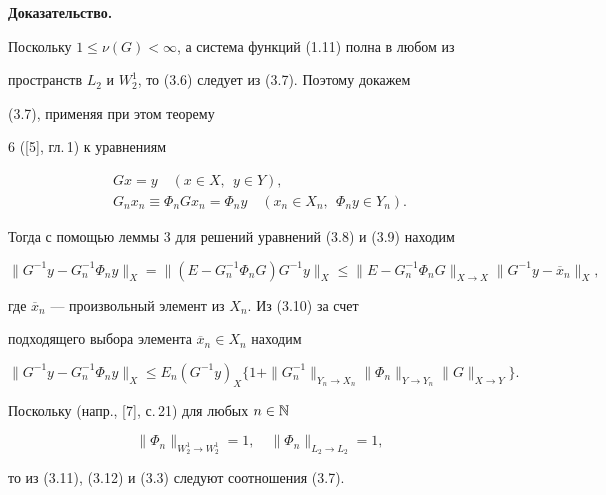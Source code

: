 {\bf Доказательство.}


Поскольку $1 \le \nu (G)<\infty$, а система функций (1.11) полна в любом из


пространств $L_2$ и $W_{2}^{1}$, то (3.6) следует из (3.7). Поэтому докажем


(3.7), применяя при этом теорему


6 ([5], гл.\,1) к уравнениям


\begin{gather}


Gx=y \quad (x \in X, \ \ y \in Y), \\


G_n x_n \equiv \Phi_n Gx_n=\Phi_n y \quad (x_n \in X_n, \ \ \Phi_n y \in


Y_n).


\end{gather}


Тогда с помощью леммы 3 для решений уравнений (3.8) и (3.9) находим


\begin{equation}


\|G^{-1}y-G_{n}^{-1}\Phi_n y\|_X=\|(E-G^{-1}_{n}\Phi_n G


)G^{-1}y\|_X\le


\|E-G_{n}^{-1}\Phi_n G\|_{X \to X} \|G^{-1}y-\overline{x}_{n}\|_{X},


\end{equation}


где $\overline{x}_n $ --- произвольный элемент из $X_n$. Из (3.10) за счет


подходящего выбора элемента $\overline{x}_n \in X_{n}$ находим


\begin{equation}


\|G^{-1}y-G^{-1}_{n}\Phi_n y \|_X \le E_n(G^{-1}y)_{X}\{ 1+


\|G^{-1}_{n}\|_{Y_n \to X_n}


\|\Phi_n\|_{Y \to Y_n}\|G\|_{X \to Y} \}.


\end{equation}


Поскольку (напр., [7], с.\,21) для любых $n \in \Bbb N$


\begin{equation}


\|\Phi_{n}\|_{W_{2}^{1}\to W_{2}^{1}}=1, \quad \|\Phi_{n}\|_{L_2 \to L_2}=1,


\end{equation}


то из (3.11), (3.12) и (3.3) следуют соотношения (3.7).





